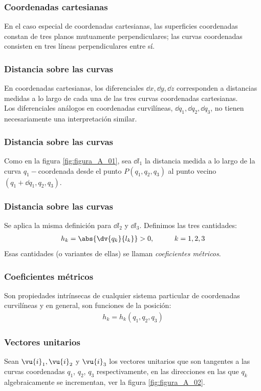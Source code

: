 \begin{frame}
\frametitle{Coordenadas cartesianas}
En el caso especial de coordenadas cartesianas, las superficies coordenadas constan de tres planos mutuamente perpendiculares; las curvas coordenadas consisten en tres líneas perpendiculares entre sí.
\end{frame}
\begin{frame}
\frametitle{Distancia sobre las curvas}
En coordenadas cartesianas, los diferenciales $\dd{x}, \dd{y}, \dd{z}$ corresponden a distancias medidas a lo largo de cada una de las tres curvas coordenadas cartesianas.
\\
\bigskip
Los diferenciales análogos en coordenadas curvilíneas, $\dd{q_{1}}, \dd{q_{2}}, \dd{q_{3}}$, no tienen necesariamente una interpretación similar.
\end{frame}
\begin{frame}
\frametitle{Distancia sobre las curvas}
Como en la figura \ref{fig:figura_A_01}, sea $\dd{l_{1}}$ la distancia medida a lo largo de la curva $q_{1}-$coordenada desde el punto $P (q_{1}, q_{2}, q_{3})$ al punto vecino $(q_{1} + \dd{q_{1}}, q_{2}, q_{3})$.
\end{frame}
\begin{frame}
\frametitle{Distancia sobre las curvas}
Se aplica la misma definición para $\dd{l_{2}}$ y $\dd{l_{3}}$. Definimos las tres cantidades:
\begin{align}
h_{k} =  \abs{\dv{q_{k}}{l_{k}}} > 0, \hspace{1cm} k = 1, 2, 3
\label{eq:ecuacion_A_01_04}    
\end{align}
Esas cantidades (o variantes de ellas) se llaman \emph{coeficientes métricos}.
\end{frame}
\begin{frame}
\frametitle{Coeficientes métricos}
Son propiedades intrínsecas de cualquier sistema particular de coordenadas curvilíneas y en general, son funciones de la posición:
\begin{align*}
h_{k} = h_{k} (q_{1}, q_{2}, q_{3})
\end{align*}
\end{frame}
\begin{frame}
\frametitle{Vectores unitarios}
Sean $\vu{i}_{1}, \vu{i}_{2}$ y $\vu{i}_{3}$ los vectores unitarios que son tangentes a las curvas coordenadas $q_{1}$, $q_{2}$, $q_{3}$ respectivamente, en las direcciones en las que $q_{k}$ algebraicamente se incrementan, ver la figura \ref{fig:figura_A_02}.
\end{frame}
